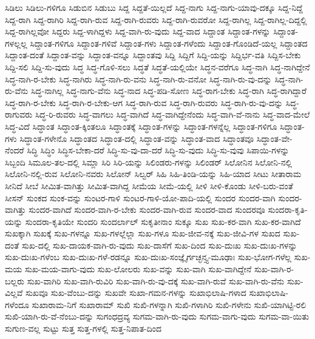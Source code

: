 {ಸಿಡಿಲು
ಸಿಡಿಲು-ಗಳಿಗೂ
ಸಿಡುಬಿನ
ಸಿಡುಬು
ಸಿದ್ದ
ಸಿದ್ದತೆ-ಯಿಲ್ಲದೆ
ಸಿದ್ದ-ನಾಗು
ಸಿದ್ದ-ನಾಗು-ಯಾವು-ದಕ್ಕೂ
ಸಿದ್ದ-ನಿದ್ದೆ
ಸಿದ್ದ-ರಾಗಿ
ಸಿದ್ದ-ರಾಗಿರಿ
ಸಿದ್ದ-ರಾಗಿ-ರುವ
ಸಿದ್ದ-ರಾಗಿ-ರುವರು
ಸಿದ್ದ-ರಾಗಿ-ರುವರೋ
ಸಿದ್ದ-ರಾಗಿಲ್ಲ
ಸಿದ್ದ-ರಾಗಿಲ್ಲ-ದಿದ್ದಲ್ಲಿ
ಸಿದ್ದ-ರಾಗಿಲ್ಲವೋ
ಸಿದ್ದರು
ಸಿದ್ದ-ಳಾಗಿದ್ದಳು
ಸಿದ್ದ-ವಾಗಿ-ರು-ವುದು
ಸಿದ್ದ-ವಾದ
ಸಿದ್ದಾಂತ
ಸಿದ್ದಾಂತ-ಗಳನ್ನು
ಸಿದ್ದಾಂತ-ಗಳಲ್ಲಲ್ಲ
ಸಿದ್ದಾಂತ-ಗಳಿಗೂ
ಸಿದ್ದಾಂತ-ಗಳಿವೆ
ಸಿದ್ದಾಂತ-ಗಳು
ಸಿದ್ದಾಂತ-ಗಳೆಂದು
ಸಿದ್ದಾಂತ-ಗೊಂಡಿದೆ-ಯಲ್ಲ
ಸಿದ್ದಾಂತದ
ಸಿದ್ದಾಂತ-ದಂತೆ
ಸಿದ್ದಾಂತ-ವನ್ನು
ಸಿದ್ದಾಂತ-ವನ್ನೂ
ಸಿದ್ದಾಂತವು
ಸಿದ್ದಿ
ಸಿದ್ದಿಗೆ
ಸಿದ್ದಿ-ಯನ್ನು
ಸಿದ್ದಿರ್ಭ-ವತಿ
ಸಿದ್ದಿಸ-ಬೇಕು
ಸಿದ್ದಿ-ಸಲಿ
ಸಿದ್ದಿ-ಸು-ವುದು
ಸಿದ್ಧ
ಸಿದ್ಧ-ಗೊಳಿ-ಸಲು
ಸಿದ್ಧತೆ
ಸಿದ್ಧತೆ-ಯಲ್ಲಿಯೇ
ಸಿದ್ಧನ-ವರೆಗೂ
ಸಿದ್ಧ-ನಾಗಿ
ಸಿದ್ಧ-ನಾಗಿದ್ದೇನೆ
ಸಿದ್ಧ-ನಾಗಿ-ರ-ಬೇಕು
ಸಿದ್ಧ-ನಾಗಿರು
ಸಿದ್ಧ-ನಾಗಿ-ರು-ವನು
ಸಿದ್ಧ-ನಾಗಿ-ರು-ವನೋ
ಸಿದ್ಧ-ನಾಗಿ-ರು-ವು-ದನ್ನು
ಸಿದ್ಧ-ನಾಗಿ-ರು-ವೆನು
ಸಿದ್ಧ-ನಾಗಿಲ್ಲ
ಸಿದ್ಧ-ನಾಗು-ವೆನು
ಸಿದ್ಧ-ನಾದ
ಸಿದ್ಧ-ಪಡಿ-ಸೋಣ
ಸಿದ್ಧ-ರಾಗ-ಬೇಕು
ಸಿದ್ಧ-ರಾಗಿ
ಸಿದ್ಧ-ರಾಗಿದ್ದಾರೆ
ಸಿದ್ಧ-ರಾಗಿ-ರ-ಬೇಕು
ಸಿದ್ಧ-ರಾಗಿ-ರ-ಬೇಕು-ಆಗ
ಸಿದ್ಧ-ರಾಗಿ-ರುವ
ಸಿದ್ಧ-ರಾಗಿ-ರುವರು
ಸಿದ್ಧ-ರಾಗಿ-ರು-ವು-ದನ್ನು
ಸಿದ್ಧ-ರಾಗುವರು
ಸಿದ್ಧ-ರಿ-ರುವರು
ಸಿದ್ಧ-ವಾಗಲು
ಸಿದ್ಧ-ವಾಗಿದೆ
ಸಿದ್ಧ-ವಾಗಿದ್ದೇನೆಂದು
ಸಿದ್ಧ-ವಾಗಿ-ವೆ-ನಾನು
ಸಿದ್ಧ-ವಾದ-ಮೇಲೆ
ಸಿದ್ಧ-ವಿದೆ
ಸಿದ್ಧಾಂತ
ಸಿದ್ಧಾಂತ-ಕ್ಕಿಂತಲೂ
ಸಿದ್ಧಾಂತಕ್ಕೆ
ಸಿದ್ಧಾಂತ-ಗಳನ್ನು
ಸಿದ್ಧಾಂತ-ಗಳನ್ನೆಲ್ಲ
ಸಿದ್ಧಾಂತ-ಗಳಿಗೂ
ಸಿದ್ಧಾಂತ-ಗಳು
ಸಿದ್ಧಾಂತ-ಗಳೇನೊ
ಸಿದ್ಧಾಂತದ
ಸಿದ್ಧಾಂತ-ದಲ್ಲಿ
ಸಿದ್ಧಾಂತ-ವನ್ನು
ಸಿದ್ಧಾಂತ-ವಾದ
ಸಿದ್ಧಾಂತವೂ
ಸಿದ್ಧಾಂತ-ವೇ-ನೆಂದರೆ
ಸಿದ್ಧಿ
ಸಿದ್ಧಿಂ
ಸಿದ್ಧಿಸ-ಬೇಕಾ-ದರೆ
ಸಿದ್ಧಿ-ಸು-ವು-ದಾ-ದರೆ
ಸಿದ್ಧಿ-ಸು-ವುದು
ಸಿದ್ಧಿ-ಸು-ವುವು
ಸಿಪಾಯಿ-ಗಳನ್ನು
ಸಿಬ್ಬಂದಿ
ಸಿಮೂಲ-ತಲ-ದಲ್ಲಿ
ಸಿಮ್ಲಾ
ಸಿರಿ
ಸಿರಿ-ಯನ್ನು
ಸಿಲಿಂಡರು-ಗಳನ್ನು
ಸಿಲಿಂಡರ್
ಸಿಲೋನಿನ
ಸಿಲೋನಿ-ನಲ್ಲಿ
ಸಿಲೋನಿ-ನಲ್ಲಿ-ರುವ
ಸಿಲೋನಿ-ನವರು
ಸಿಲೋನ್
ಸಿಲ್ವರ್
ಸಿಹಿ
ಸಿಹಿ-ತಿಂಡಿ-ಯನ್ನು
ಸಿಹಿ-ಯಾದ
ಸೀಟು
ಸೀತಾರಾಮ
ಸೀನಿದೆ
ಸೀಬೆ
ಸೀಮಿತ-ವಾಗಿತ್ತು
ಸೀಮಿತ-ವಾಗಿದ್ದ
ಸೀಮೆಯ
ಸೀಮೆ-ಯಲ್ಲಿ
ಸೀಳಿ
ಸೀಳಿ-ಕೊಂಡು
ಸೀಳಿ-ಬರು-ವಂತೆ
ಸೀಸನ್
ಸುಂಕದ
ಸುಂಕ-ವನ್ನು
ಸುಂಟರ-ಗಾಳಿ
ಸುಂಟರ-ಗಾಳಿ-ಯೋ-ಪಾದಿ-ಯಲ್ಲಿ
ಸುಂದರ
ಸುಂದರ-ವಾಗಿ
ಸುಂದರ-ವಾಗಿತ್ತು
ಸುಂದರ-ವಾಗಿದೆ
ಸುಂದರ-ವಾಗಿ-ರ-ಬೇಕು
ಸುಂದರ-ವಾಗಿ-ರುವ
ಸುಂದರ-ವಾದ
ಸುಂದರವೂ
ಸುಂದರಾ-ಕೃತಿ-ಯನ್ನು
ಸುಂದರಾ-ಕೃತಿಯೇ
ಸುಂದರಿ
ಸುಂದರ್ಲಾಲ್
ಸುಕೃತೀನಾಂ
ಸುಕ್ಕೂ
ಸುಖ
ಸುಖ-ಕರ-ವಾಗಿ
ಸುಖ-ಕರ-ವಾಗಿದೆ
ಸುಖಕ್ಕಾಗಿ
ಸುಖಕ್ಕೆ
ಸುಖ-ಗಳನ್ನೂ
ಸುಖ-ಗಳಲ್ಲೆಲ್ಲಾ
ಸುಖ-ಗಳೂ
ಸುಖ-ಜೀವ-ನಕ್ಕೆ
ಸುಖ-ಜೀವಿ-ಗಳ
ಸುಖದ
ಸುಖ-ದಂತೆ
ಸುಖ-ದಲ್ಲಿ
ಸುಖ-ದಾಯಕ-ವಾಗಿ-ರು-ವುದು
ಸುಖ-ದಾಸೆಗೆ
ಸುಖ-ದಿಂದ
ಸುಖ-ದುಃಖ
ಸುಖ-ದುಃಖ-ಗಳನ್ನು
ಸುಖ-ದುಃಖ-ಗಳೆಂಬ
ಸುಖ-ದುಃಖ-ಗಳೆ-ರಡನ್ನೂ
ಸುಖ-ದುಃಖ-ಸಂಜ್ಞೈರ್ಗಚ್ಛನ್ತ್ಯ-ಮೂಢಾಃ
ಸುಖ-ಭೋಗ-ಗಳೆಲ್ಲ
ಸುಖ-ಮಯ
ಸುಖ-ಮಯ-ವಾಗು-ವುದು
ಸುಖ-ಲೋಲರು
ಸುಖ-ವನ್ನು
ಸುಖ-ವಾಗಿ
ಸುಖ-ವಾಗಿದ್ದೇನೆ
ಸುಖ-ವಾಗಿ-ರ-ಬಲ್ಲರು
ಸುಖ-ವಾಗಿರಿ
ಸುಖ-ವಾಗಿ-ರುವಿರಿ
ಸುಖ-ವಾಗಿ-ರು-ವು-ದಕ್ಕೆ
ಸುಖ-ವಾಗಿ-ರುವೆ
ಸುಖ-ವಾಗಿ-ರು-ವೆನು
ಸುಖ-ವಿಲ್ಲವೆ
ಸುಖವೂ
ಸುಖ-ವೆಂಬು-ದನ್ನು
ಸುಖವೇ
ಸುಖಾ-ಗಮನ-ಗಳನ್ನು
ಸುಖಾಭಿಲಾಷಿ-ಗಳಾದ
ಸುಖಾಭಿಲಾಷಿ-ಗಳೆಂದೂ
ಸುಖಾರಾಮ-ನಿಗೆ
ಸುಖಾರಾಮ್
ಸುಖಿ
ಸುಖಿ-ಗಳನ್ನಾಗಿ
ಸುಖಿ-ಗಳಾಗಿರಿ
ಸುಖಿ-ಗಳೇನು
ಸುಖಿ-ಯಾಗಿಟ್ಟಿ-ರಲಿ
ಸುಖಿ-ಯಾಗಿ-ರು-ವೆ-ನೆಂಬು-ದನ್ನು
ಸುಗಂಧದ್ರವ್ಯ
ಸುಗಮ-ವಾಗಿ-ರು-ವುದು
ಸುಗಮ-ವಾಗು-ವುದು
ಸುಗಮ-ವಾ-ಯಿತು
ಸುಗುಣ-ವಲ್ಲ
ಸುಟ್ಟು
ಸುತ್ತ
ಸುತ್ತ-ಗಳಲ್ಲಿ
ಸುತ್ತ-ನಿಪಾತ-ದಿಂದ
}
